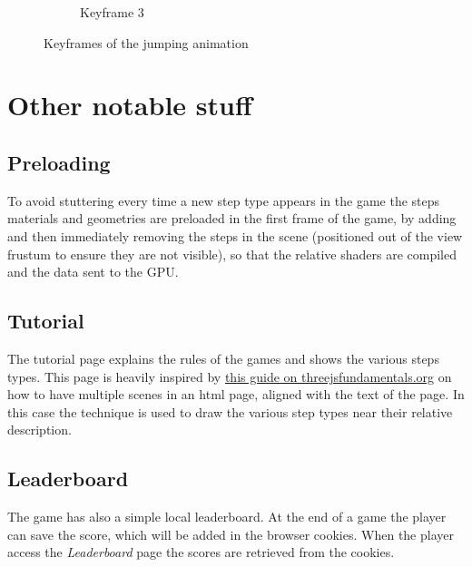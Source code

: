 \documentclass[12pt]{article}
\begin{document}
\begin{figure}[h]
\begin{subfigure}{.33\textwidth}
  \caption{Keyframe 3}
  \label{fig:key3}
 \end{subfigure}
\caption{Keyframes of the jumping animation}
\label{fig:keyframes}
\end{figure}

\newpage

\section{Other notable stuff}

\subsection{Preloading}
To avoid stuttering every time a new step type appears in the game the steps materials and geometries are preloaded in the first frame of the game, by adding and then immediately removing the steps in the scene (positioned out of the view frustum to ensure they are not visible), so that the relative shaders are compiled and the data sent to the GPU.

\subsection{Tutorial}
The tutorial page explains the rules of the games and shows the various steps types. This page is heavily inspired by \href{https://threejsfundamentals.org/threejs/lessons/threejs-multiple-scenes.html}{this guide on threejsfundamentals.org} on how to have multiple scenes in an html page, aligned with the text of the page. In this case the technique is used to draw the various step types near their relative description.

\subsection{Leaderboard}
The game has also a simple local leaderboard. At the end of a game the player can save the score, which will be added in the browser cookies. When the player access the \textit{Leaderboard} page the scores are retrieved from the cookies.
\end{document}
